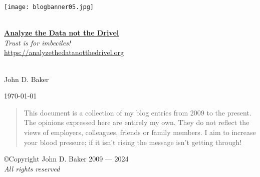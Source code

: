 %

\begin{titlepage}
 
\begin{center}

\texttt{[image: blogbanner05.jpg]}
 
\HRule \\[0.8cm]

{\Huge \href{https://analyzethedatanotthedrivel.org}{\textbf{Analyze the Data not the Drivel}}}\\[0.4cm]

\textsl{Trust is for imbeciles!}\\[0.4cm]

\url{https://analyzethedatanotthedrivel.org}\\[0.4cm]
 
\HRule \\[0.8cm]
 
 
\begin{minipage}{0.45\textwidth}
\begin{flushleft}
{\large John D. Baker} \\
\end{flushleft}
\end{minipage}
\begin{minipage}{0.45\textwidth}
\begin{flushright}
{\large \today} \\
\end{flushright}
\end{minipage}

\vspace{2cm}

\begin{quotation}
This document is a collection of my blog entries from 2009 to the present. The
opinions expressed here are entirely my own.
They do not reflect the views of employers, colleagues, friends or family members.
I aim to increase your blood pressure; if it isn't
rising the message isn't getting through!
\end{quotation}

\vfill

\copyright Copyright John D. Baker 2009 --- 2024 \\
\emph{All rights reserved} \\

 
\end{center}


 
\end{titlepage}

%
